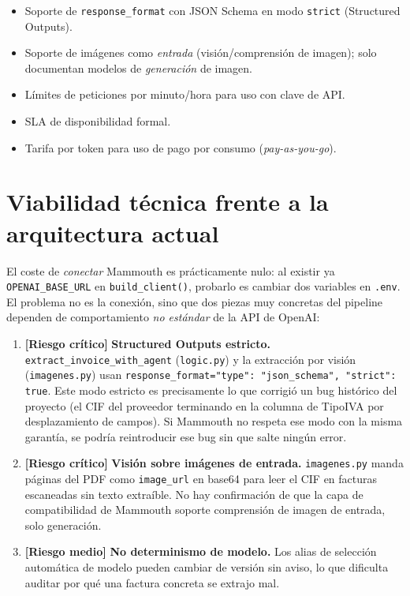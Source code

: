 \documentclass[11pt,a4paper]{article}
\newcommand{\riesgo}[1]{\textcolor{riesgoalto}{\textbf{[#1]}}}
\newcommand{\advertencia}[1]{\textcolor{riesgomedio}{\textbf{[#1]}}}
\begin{document}
\begin{itemize}
    \item Soporte de \texttt{response\_format} con JSON Schema en modo
    \texttt{strict} (Structured Outputs).
    \item Soporte de imágenes como \emph{entrada} (visión/comprensión de imagen);
    solo documentan modelos de \emph{generación} de imagen.
    \item Límites de peticiones por minuto/hora para uso con clave de API.
    \item SLA de disponibilidad formal.
    \item Tarifa por token para uso de pago por consumo (\emph{pay-as-you-go}).
\end{itemize}

\section{Viabilidad técnica frente a la arquitectura actual}

El coste de \emph{conectar} Mammouth es prácticamente nulo: al existir ya
\texttt{OPENAI\_BASE\_URL} en \texttt{build\_client()}, probarlo es cambiar dos
variables en \texttt{.env}. El problema no es la conexión, sino que dos piezas
muy concretas del pipeline dependen de comportamiento \emph{no estándar} de la
API de OpenAI:

\begin{enumerate}
    \item \riesgo{Riesgo crítico} \textbf{Structured Outputs estricto.}
    \texttt{extract\_invoice\_with\_agent} (\texttt{logic.py}) y la extracción por
    visión (\texttt{imagenes.py}) usan
    \texttt{response\_format={"type": "json\_schema", "strict": true}}. Este modo
    estricto es precisamente lo que corrigió un bug histórico del proyecto (el
    CIF del proveedor terminando en la columna de TipoIVA por desplazamiento de
    campos). Si Mammouth no respeta ese modo con la misma garantía, se podría
    reintroducir ese bug sin que salte ningún error.
    \item \riesgo{Riesgo crítico} \textbf{Visión sobre imágenes de entrada.}
    \texttt{imagenes.py} manda páginas del PDF como \texttt{image\_url} en base64
    para leer el CIF en facturas escaneadas sin texto extraíble. No hay
    confirmación de que la capa de compatibilidad de Mammouth soporte
    comprensión de imagen de entrada, solo generación.
    \item \advertencia{Riesgo medio} \textbf{No determinismo de modelo.} Los
    alias de selección automática de modelo pueden cambiar de versión sin
    aviso, lo que dificulta auditar por qué una factura concreta se extrajo mal.
\end{enumerate}
\end{document}
